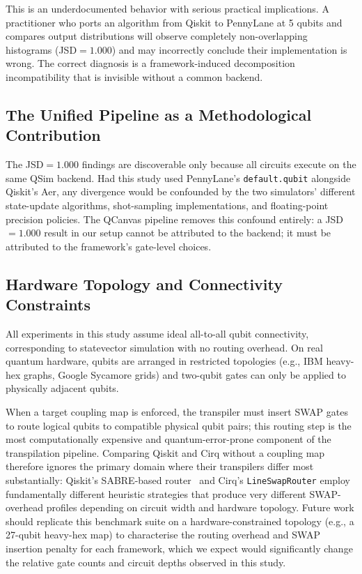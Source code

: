 This is an underdocumented behavior with serious practical implications.
A practitioner who ports an algorithm from Qiskit to PennyLane at 5
qubits and compares output distributions will observe completely
non-overlapping histograms (JSD$=1.000$) and may incorrectly conclude
their implementation is wrong.
The correct diagnosis is a framework-induced decomposition
incompatibility that is invisible without a common backend.

\subsection{The Unified Pipeline as a Methodological Contribution}

The JSD$=1.000$ findings are discoverable only because all circuits
execute on the same QSim backend.
Had this study used PennyLane's \texttt{default.qubit} alongside
Qiskit's Aer, any divergence would be confounded by the two simulators'
different state-update algorithms, shot-sampling implementations, and
floating-point precision policies.
The QCanvas pipeline removes this confound entirely: a JSD$=1.000$
result in our setup cannot be attributed to the backend; it must be
attributed to the framework's gate-level choices.

\subsection{Hardware Topology and Connectivity Constraints}
\label{sec:hw-topology}

All experiments in this study assume ideal all-to-all qubit connectivity,
corresponding to statevector simulation with no routing overhead.
On real quantum hardware, qubits are arranged in restricted topologies
(e.g., IBM heavy-hex graphs, Google Sycamore grids) and two-qubit gates
can only be applied to physically adjacent qubits.

When a target coupling map is enforced, the transpiler must insert SWAP
gates to route logical qubits to compatible physical qubit pairs;
this routing step is the most computationally expensive and
quantum-error-prone component of the transpilation pipeline.
Comparing Qiskit and Cirq without a coupling map therefore ignores the
primary domain where their transpilers differ most substantially:
Qiskit's SABRE-based router~\cite{li2019tackling} and Cirq's
\texttt{LineSwapRouter} employ fundamentally different heuristic
strategies that produce very different SWAP-overhead profiles depending on
circuit width and hardware topology.
Future work should replicate this benchmark suite on a hardware-constrained
topology (e.g., a 27-qubit heavy-hex map) to characterise the routing
overhead and SWAP insertion penalty for each framework, which we expect
would significantly change the relative gate counts and circuit depths
observed in this study.

